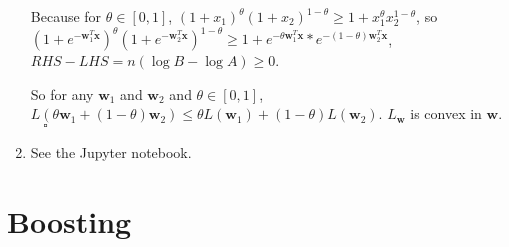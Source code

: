 \documentclass[paper=letter, fontsize=12pt]{article}
\begin{document}
\begin{enumerate}[label=(\alph*)]
	Because for $\theta \in [0, 1]$, $(1 + x_1)^\theta (1 + x_2) ^ {1 - \theta} \geq 1 + x_1^{\theta} x_2^{1 - \theta}$, so $(1 + e^{-\mathbf{w}^T_1 \mathbf{x}}) ^ \theta (1 + e^{-\mathbf{w}^T_2 \mathbf{x}}) ^ {1 - \theta} \geq 1 + e^{-\theta \mathbf{w}_1^T \mathbf{x}} * e^{-(1- \theta) \mathbf{w}_2^T \mathbf{x}}$, $RHS - LHS = n(\log{B} - \log{A}) \geq 0$.
	
	So for any $\mathbf{w}_1$ and $\mathbf{w}_2$ and $\theta \in [0, 1]$, $L(\theta \mathbf{w}_1 + (1- \theta) \mathbf{w}_2) \leq \theta L(\mathbf{w}_1) + (1 - \theta) L(\mathbf{w}_2)$. $L_{\mathbf{w}}$ is convex in $\mathbf{w}$. $\ \ \ \ \square$
	
	\item See the Jupyter notebook.
	
\end{enumerate}

\section{Boosting}
\end{document}
